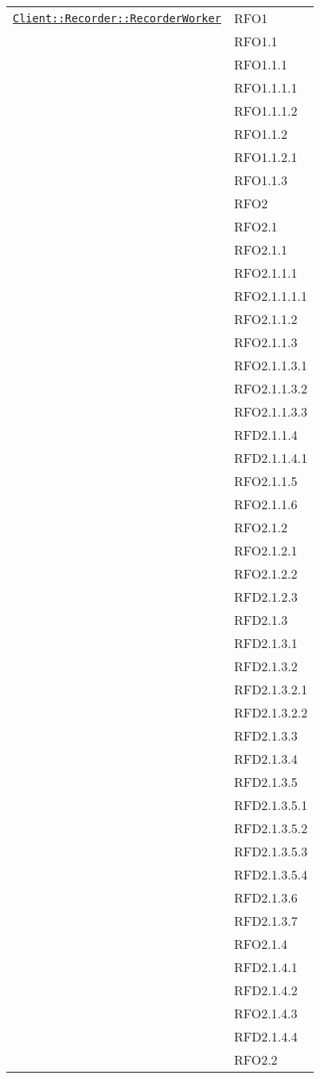 \begin{longtable}{|>{\centering}m{10cm}|m{3cm}<{\centering}|}
\hyperref[Client::Recorder::RecorderWorker]{\texttt{Client::Recorder::RecorderWorker}} & RFO1\\
& RFO1.1\\
& RFO1.1.1\\
& RFO1.1.1.1\\
& RFO1.1.1.2\\
& RFO1.1.2\\
& RFO1.1.2.1\\
& RFO1.1.3\\
& RFO2\\
& RFO2.1\\
& RFO2.1.1\\
& RFO2.1.1.1\\
& RFO2.1.1.1.1\\
& RFO2.1.1.2\\
& RFO2.1.1.3\\
& RFO2.1.1.3.1\\
& RFO2.1.1.3.2\\
& RFO2.1.1.3.3\\
& RFD2.1.1.4\\
& RFD2.1.1.4.1\\
& RFO2.1.1.5\\
& RFO2.1.1.6\\
& RFO2.1.2\\
& RFO2.1.2.1\\
& RFO2.1.2.2\\
& RFD2.1.2.3\\
& RFD2.1.3\\
& RFD2.1.3.1\\
& RFD2.1.3.2\\
& RFD2.1.3.2.1\\
& RFD2.1.3.2.2\\
& RFD2.1.3.3\\
& RFD2.1.3.4\\
& RFD2.1.3.5\\
& RFD2.1.3.5.1\\
& RFD2.1.3.5.2\\
& RFD2.1.3.5.3\\
& RFD2.1.3.5.4\\
& RFD2.1.3.6\\
& RFD2.1.3.7\\
& RFO2.1.4\\
& RFD2.1.4.1\\
& RFD2.1.4.2\\
& RFO2.1.4.3\\
& RFD2.1.4.4\\
& RFO2.2\\

\end{longtable}
